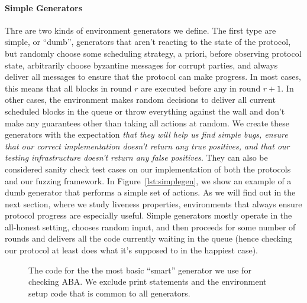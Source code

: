 \paragraph{Simple Generators}
Thre are two kinds of environment generators we define.  The first type are
simple, or ``dumb'', generators that aren't reacting to the state of the
protocol, but randomly choose some scheduling strategy, a priori, before
observing protocol state, arbitrarily choose byzantine messages for corrupt
parties, and always deliver all messages to ensure that the protocol can make
progress.  In most cases, this means that all blocks in round $r$ are executed
before any in round $r+1$.  In other cases, the environment makes random
decisions to deliver all current scheduled blocks in the queue or throw
everything against the wall and don't make any guarantees other than taking all
actions at random.  We create these generators with the expectation \emph{that
they will help us find simple bugs, ensure that our correct implementation
doesn't return any true positives, and that our testing infrastructure doesn't
return any false positives}.  They can also be considered sanity check test
cases on our implementation of both the protocols and our fuzzing framework.
In Figure~\ref{lst:simplegen}, we show an example of a dumb generator that
performs a simple set of actions.  As we will find out in the next section,
where we study liveness properties, environments that always ensure protocol
progress are especially useful.  Simple generators mostly operate in the
all-honest setting, chooses random input, and then proceeds for some number of
rounds and delivers all the code currently waiting in the queue (hence checking
our protocol at least does what it's supposed to in the happiest case).


\begin{figure*}

\caption{The code for the the most basic ``smart'' generator we use for
checking ABA. We exclude print statements and the environment setup code that
is common to all generators.}
\label{lst:genaba}
\end{figure*}

